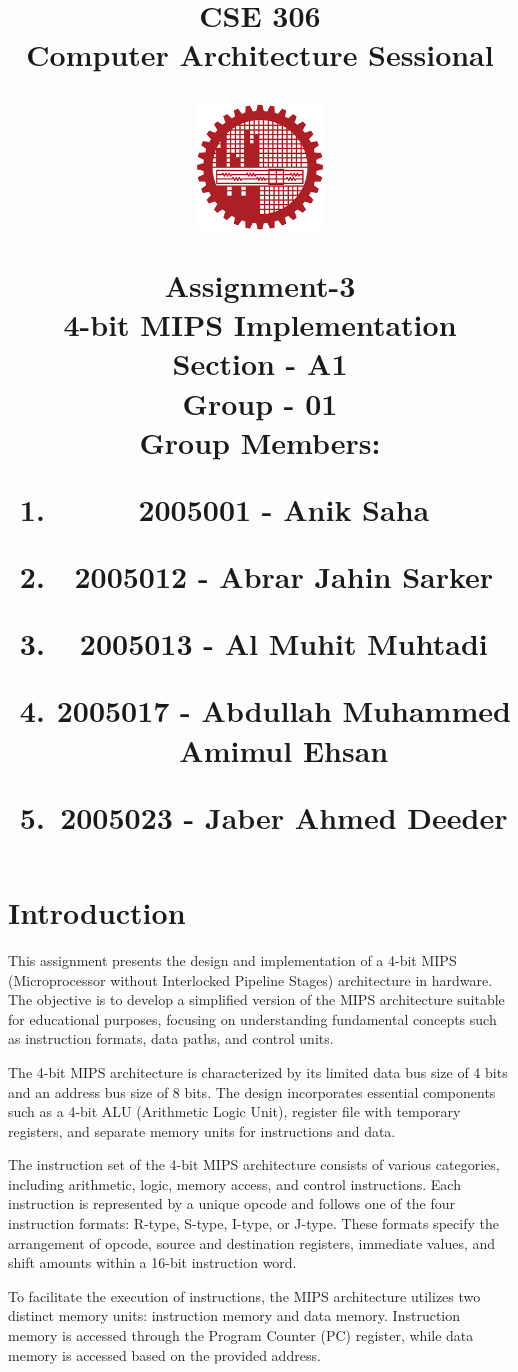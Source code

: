 \documentclass{article}
\title{CSE 306 \\
		Computer Architecture Sessional \\
		
		\vspace{5mm}
		
		\begin{figure}[h]
			\centering
			\includegraphics[width=0.3\textwidth]{images/buet.png}
			\label{fig:enter-label}
		\end{figure}
		
		\vspace{5mm}
		Assignment-3\\
		4-bit MIPS Implementation \\
		\vspace{10mm}
		Section - A1 \\
		Group - 01 \\
		\vspace{15mm}
		\RaggedRight
		Group Members: \\
		\normalsize	{
			\centering
			\begin{enumerate}[]
				\item 2005001 - Anik Saha
				\item 2005012 - Abrar Jahin Sarker
				\item 2005013 - Al Muhit Muhtadi
				\item 2005017 - Abdullah Muhammed Amimul Ehsan
				\item 2005023 - Jaber Ahmed Deeder
			\end{enumerate}
		}
	}
\author{}
\date{}
\begin{document}
		
		\maketitle
		
		
		
		
		
		
		
		\section{Introduction}
		
		This assignment  presents the design and implementation of a 4-bit MIPS (Microprocessor without Interlocked Pipeline Stages) architecture in hardware. The objective is to develop a simplified version of the MIPS architecture suitable for educational purposes, focusing on understanding fundamental concepts such as instruction formats, data paths, and control units.
		
		The 4-bit MIPS architecture is characterized by its limited data bus size of 4 bits and an address bus size of 8 bits. The design incorporates essential components such as a 4-bit ALU (Arithmetic Logic Unit), register file with temporary registers, and separate memory units for instructions and data.
		
		The instruction set of the 4-bit MIPS architecture consists of various categories, including arithmetic, logic, memory access, and control instructions. Each instruction is represented by a unique opcode and follows one of the four instruction formats: R-type, S-type, I-type, or J-type. These formats specify the arrangement of opcode, source and destination registers, immediate values, and shift amounts within a 16-bit instruction word.
		
		To facilitate the execution of instructions, the MIPS architecture utilizes two distinct memory units: instruction memory and data memory. Instruction memory is accessed through the Program Counter (PC) register, while data memory is accessed based on the provided address.
		
\end{document}
